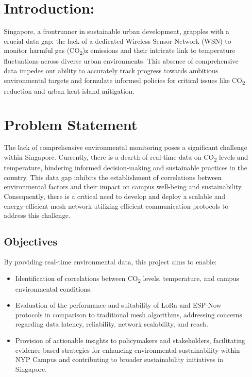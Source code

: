\section*{Introduction:}\label{sec:introduction}
Singapore, a frontrunner in sustainable urban development, grapples with a crucial data gap: the lack of a dedicated Wireless Sensor Network (WSN) to monitor harmful gas (CO\textsubscript{2})z emissions and their intricate link to temperature fluctuations across diverse urban environments. This absence of comprehensive data impedes our ability to accurately track progress towards ambitious environmental targets and formulate informed policies for critical issues like CO\textsubscript{2} reduction and urban heat island mitigation.

\section*{Problem Statement}\label{sec:problem_statement}
The lack of comprehensive environmental monitoring poses a significant challenge within Singapore. Currently, there is a dearth of real-time data on CO\textsubscript{2} levels and temperature, hindering informed decision-making and sustainable practices in the country. This data gap inhibits the establishment of correlations between environmental factors and their impact on campus well-being and sustainability. Consequently, there is a critical need to develop and deploy a scalable and energy-efficient mesh network utilizing efficient communication protocols to address this challenge. 

\subsection{Objectives}\label{sec:objectives}

By providing real-time environmental data, this project aims to enable:

\begin{itemize}
    \item Identification of correlations between CO\textsubscript{2} levels, temperature, and campus environmental conditions.
    \item Evaluation of the performance and suitability of LoRa and ESP-Now protocols in comparison to traditional mesh algorithms, addressing concerns regarding data latency, reliability, network scalability, and reach.
    \item Provision of actionable insights to policymakers and stakeholders, facilitating evidence-based strategies for enhancing environmental sustainability within NYP Campus and contributing to broader sustainability initiatives in Singapore.
\end{itemize}

